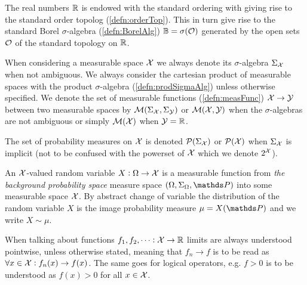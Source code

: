 The real numbers $\mathbb{R}$ is endowed with
the standard ordering with
giving rise to the
standard order topolog
(\cref{defn:orderTop}).
This in turn give rise to the standard Borel $\sigma$-algebra
(\cref{defn:BorelAlg}) $\mathbb{B} = \sigma(\mathcal{O})$
generated by the open sets $\mathcal{O}$ of the standard topology on $\mathbb{R}$.

When considering a measurable space $\mathcal{X}$ 
we always denote its $\sigma$-algebra
$\Sigma_\mathcal{X}$ when not ambiguous.
We always
consider the cartesian product of measurable spaces
with the product $\sigma$-algebra (\cref{defn:prodSigmaAlg})
unless otherwise specified.
We denote the set of measurable functions (\cref{defn:measFunc})
$\mathcal{X} \to \mathcal{Y}$ between two measurable spaces by 
$\mathcal{M}(\Sigma_\mathcal{X}, \Sigma_\mathcal{Y})$ or $\mathcal{M}(\mathcal{X}, \mathcal{Y})$
when the $\sigma$-algebras are not ambiguous
or simply $\mathcal{M}(\mathcal{X})$ when $\mathcal{Y} = \mathbb{R}$.

The set of probability measures on $\mathcal{X}$ is denoted
$\mathcal{P}(\Sigma_\mathcal{X})$ or $\mathcal{P}(\mathcal{X})$ when $\Sigma_\mathcal{X}$ is implicit
(not to be confused with the powerset of $\mathcal{X}$
which we denote $2^{\mathcal{X}}$).

An $\mathcal{X}$-valued random variable $X : \Omega \to \mathcal{X}$ is a
measurable function from \emph{the background probability space}
measure space $(\Omega, \Sigma_\Omega, \Prob)$ into some measurable
space $\mathcal{X}$.
By abstract change of variable the distribution of the random variable $X$
is the image probability measure $\mu = X(\Prob)$ and we write
$X \sim \mu$.

When talking about functions $f_1, f_2, \dots : \mathcal{X} \to \mathbb{R}$
limits are always understood pointwise, unless otherwise stated,
meaning that $f_n \to f$ is to be read as
$\forall x \in \mathcal{X} : f_n(x) \to f(x)$.
The same goes for logical operators, e.g. $f > 0$ is to be understood
as $f(x) > 0$ for all $x \in \mathcal{X}$.


